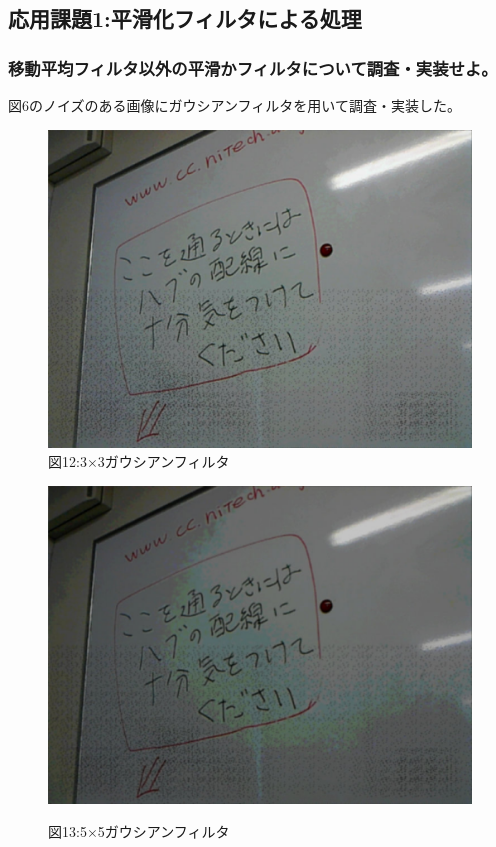 ﻿\documentclass[a4j,11pt]{jarticle}
\begin{document}
\subsection{応用課題1:平滑化フィルタによる処理}

\subsubsection{移動平均フィルタ以外の平滑かフィルタについて調査・実装せよ。}
図6のノイズのある画像にガウシアンフィルタを用いて調査・実装した。
\clearpage
\begin{figure}[tb]


  \begin{minipage}{0.49\hsize} %
   \center
   \includegraphics[width=\hsize]{./eps/smooth-noiz-gaussian-dim3.eps}
   図12:3$\times$3ガウシアンフィルタ
 \end{minipage}
 \begin{minipage}{0.49\hsize} %
   \center
   \includegraphics[width=\hsize]{./eps/smooth-noiz-gaussian-dim5.eps}

   図13:5$\times$5ガウシアンフィルタ
 \end{minipage}
 \label{fig:affine2}
\end{figure}
\end{document}
